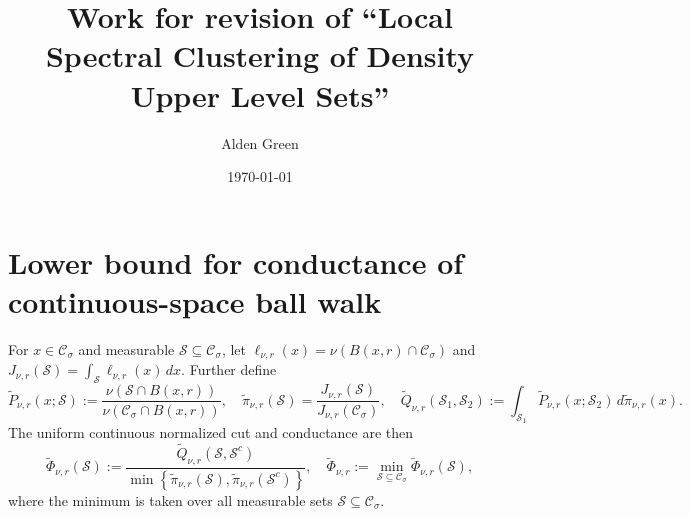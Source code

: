 \documentclass{report}
\newcommand{\set}[1]{\left\{#1\right\}}
\newcommand{\1}{\mathbf{1}}
\newcommand{\Sset}{\mathcal{S}}
\newcommand{\mc}[1]{\mathcal{#1}}
\theoremstyle{alden}
\theoremstyle{aldenthm}
\theoremstyle{definition}
\theoremstyle{remark}
\begin{document}
\title{Work for revision of ``Local Spectral Clustering of Density Upper Level Sets''}
\author{Alden Green}
\date{\today}
\maketitle

\chapter{Lower bound for conductance of continuous-space ball walk}
For $x \in \mc{C}_{\sigma}$ and measurable $\Sset \subseteq \mc{C}_{\sigma}$, let $\ell_{\nu,r}(x) = \nu(B(x,r) \cap \mc{C}_{\sigma})$ and ${J}_{\nu,r}(\mc{S}) = \int_{\mc{S}} \ell_{\nu,r}(x) \,dx$. Further define
\begin{equation*}
\widetilde{P}_{\nu,r}(x; \Sset) := \frac{\nu(\Sset \cap B(x,r))}{\nu(\mc{C}_{\sigma} \cap B(x,r))}, \quad \widetilde{\pi}_{\nu,r}(\Sset) = \frac{J_{\nu,r}(\mc{S})}{J_{\nu,r}(\mc{C}_{\sigma})}, \quad  \widetilde{Q}_{\nu,r}(\Sset_1,\Sset_2) := \int_{\Sset_1} \widetilde{P}_{\nu,r}(x;\Sset_2) \,d\widetilde{\pi}_{\nu,r}(x).
\end{equation*}
The uniform continuous normalized cut and conductance are then
\begin{equation*}
\widetilde{\Phi}_{\nu,r}(\Sset) := \frac{\widetilde{Q}_{\nu,r}(\Sset, \Sset^c)}{\min\set{\widetilde{\pi}_{\nu,r}(\Sset),\widetilde{\pi}_{\nu,r}(\Sset^c)}}, \quad \widetilde{\Phi}_{\nu,r} := \min_{\Sset \subseteq \mc{C}_{\sigma}} \widetilde{\Phi}_{\nu,r}(\Sset),
\end{equation*}
where the minimum is taken over all measurable sets $\Sset \subseteq \mc{C}_{\sigma}$.
\end{document}

